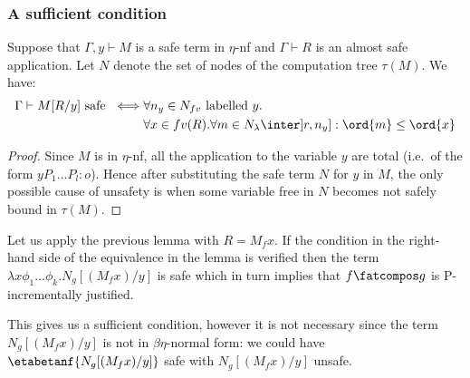 \subsubsection{A sufficient condition}
\begin{lemma}
Suppose that $\Gamma,y \vdash M$ is a safe term in $\eta$-nf and $\Gamma \vdash R$ is an almost safe application. Let $N$ denote the set of nodes of the computation tree $\tau(M)$. We have:
\begin{align*}
\Gamma \vdash M[R/y] \mbox{ safe } 
\iff& \forall n_y \in N_{fv} \mbox{ labelled $y$}. \\
  &\forall x \in fv(R) . \forall m \in N_{\lambda} \inter ]r,n_y] : \ord{m} \leq \ord{x}
\end{align*}
\end{lemma}
\begin{proof}
Since $M$ is in $\eta$-nf, all the application to the variable $y$ are total (i.e.~of the form $y P_1 \ldots P_l :o$). Hence after substituting the safe term $N$ for $y$ in $M$, the only possible cause of unsafety is when
some variable free in $N$ becomes not safely bound in $\tau(M)$.
\end{proof}

Let us apply the previous lemma with $R= M_f x$. If the condition in the right-hand side of the equivalence in the lemma is verified then the term  $\lambda x \phi_1 \dots \phi_k. N_g [(M_f x) / y]$ is safe which in turn implies that $f\fatcompos g$ is P-incrementally justified.

This gives us a sufficient condition, however it is not necessary since the term $N_g[(M_f x)/y]$ is not in $\beta\eta$-normal form: we could have $\etabetanf{N_g[(M_f x) /y]}$ safe with $N_g[(M_f x) /y]$ unsafe.

